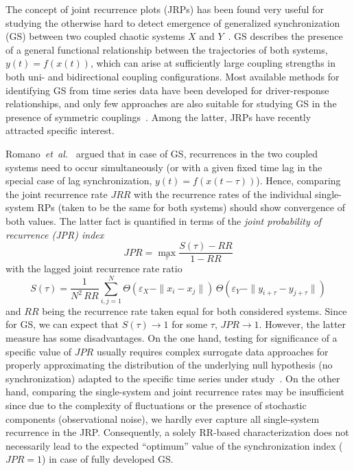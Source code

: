 The concept of joint recurrence plots (JRPs) has been found very useful for studying the otherwise hard to detect emergence of generalized synchronization (GS) between two coupled chaotic systems $X$ and $Y$~\cite{romano2005}. GS describes the presence of a general functional relationship between the trajectories of both systems, $y(t)=f(x(t))$, which can arise at sufficiently large coupling strengths in both uni- and bidirectional coupling configurations. Most available methods for identifying GS from time series data have been developed for driver-response relationships, and only few approaches are also suitable for studying GS in the presence of symmetric couplings~\cite{Feldhoff2013}. Among the latter, JRPs have recently attracted specific interest.

Romano~\textit{et~al.}~\cite{romano2005} argued that in case of GS, recurrences in the two coupled systems need to occur simultaneously (or with a given fixed time lag in the special case of lag synchronization, $y(t)=f(x(t-\tau))$). Hence, comparing the joint recurrence rate $JRR$ with the recurrence rates of the individual single-system RPs (taken to be the same for both systems) should show convergence of both values. The latter fact is quantified in terms of the \textit{joint probability of recurrence (JPR) index}
\begin{equation}
JPR = \max_{\tau} \frac{S(\tau)-RR}{1-RR}
\label{eq:jpr}
\end{equation}
\noindent
with the lagged joint recurrence rate ratio
\begin{equation}
S(\tau)=\frac{1}{N^2\, RR}\sum_{i,j=1}^N \Theta(\varepsilon_X-\|x_i-x_j\|)\, \Theta(\varepsilon_Y-\|y_{i+\tau}-y_{j+\tau}\|)
\end{equation}
\noindent
and $RR$ being the recurrence rate taken equal for both considered systems. Since for GS, we can expect that $S(\tau)\to 1$ for some $\tau$, $JPR\to 1$. However, the latter measure has some disadvantages. On the one hand, testing for significance of a specific value of $JPR$ usually requires complex surrogate data approaches for properly approximating the distribution of the underlying null hypothesis (no synchronization) adapted to the specific time series under study~\cite{thiel2006b}. On the other hand, comparing the single-system and joint recurrence rates may be insufficient since due to the complexity of fluctuations or the presence of stochastic components (observational noise), we hardly ever capture all single-system recurrence in the JRP. Consequently, a solely RR-based characterization does not necessarily lead to the expected ``optimum'' value of the synchronization index ($JPR=1$) in case of fully developed GS.

